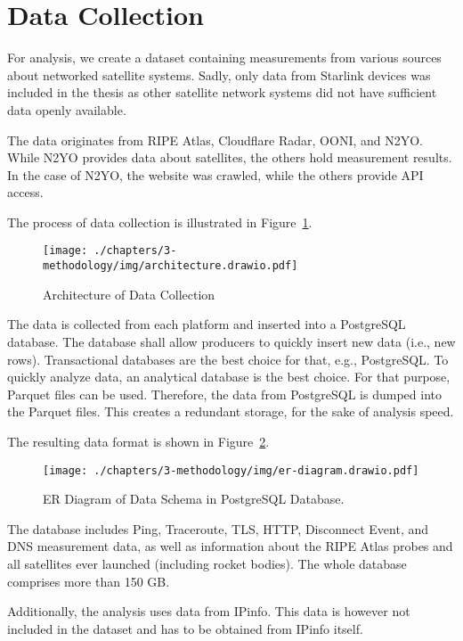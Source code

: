 \section{Data Collection} \label{sec:data-collection}

For analysis, we create a dataset containing measurements from various sources
about networked satellite systems. Sadly, only data from Starlink devices was
included in the thesis as other satellite network systems did not have
sufficient data openly available.

The data originates from RIPE Atlas, Cloudflare Radar, OONI, and N2YO. While
N2YO provides data about satellites, the others hold measurement results. In
the case of N2YO, the website was crawled, while the others provide API
access.

The process of data collection is illustrated in
Figure~\ref{fig:data-collection-process}.

\begin{figure}[h]
	\centering
	\texttt{[image: ./chapters/3-methodology/img/architecture.drawio.pdf]}
	\caption{Architecture of Data Collection}
	\label{fig:data-collection-process}
\end{figure}

The data is collected from each platform and inserted into a PostgreSQL
database. The database shall allow producers to quickly insert new data (i.e.,
new rows). Transactional databases are the best choice for that, e.g.,
PostgreSQL. To quickly analyze data, an analytical database is the best choice.
For that purpose, Parquet files can be used. Therefore, the data from
PostgreSQL is dumped into the Parquet files. This creates a redundant storage,
for the sake of analysis speed.

The resulting data format is shown in Figure~\ref{fig:er-diagram}.

\begin{figure}
	\texttt{[image: ./chapters/3-methodology/img/er-diagram.drawio.pdf]}
	\caption{ER Diagram of Data Schema in PostgreSQL Database.}
	\label{fig:er-diagram}
\end{figure}

The database includes Ping, Traceroute, TLS, HTTP, Disconnect Event, and DNS
measurement data, as well as information about the RIPE Atlas probes and all
satellites ever launched (including rocket bodies).
The whole database comprises more than 150 GB.

Additionally, the analysis uses data from IPinfo. This data is however not
included in the dataset and has to be obtained from IPinfo itself.

